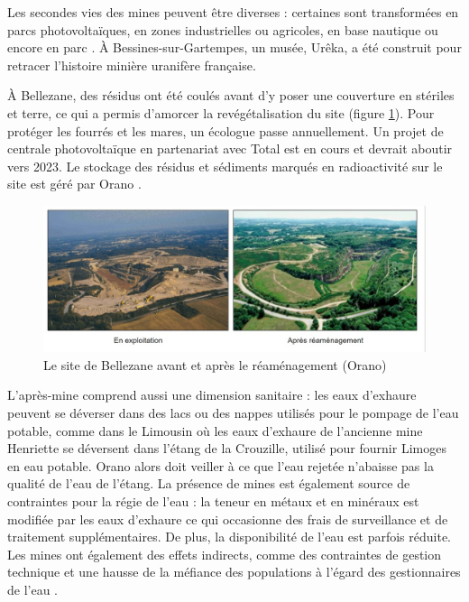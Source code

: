 \documentclass{article}
\begin{document}
Les secondes vies des mines peuvent être diverses : certaines sont transformées en parcs photovoltaïques, en zones industrielles ou agricoles, en base nautique ou encore en parc \cite{himeur_apres-mine_2020}. À Bessines-sur-Gartempes, un musée, Urêka, a été construit pour retracer l'histoire minière uranifère française.

À Bellezane, des résidus ont été coulés avant d’y poser une couverture en stériles et terre, ce qui a permis d'amorcer la revégétalisation du site (figure \ref{fig:bellezane_avant_apres}). Pour protéger les fourrés et les mares, un écologue passe annuellement. Un projet de centrale photovoltaïque en partenariat avec Total est en cours et devrait aboutir vers 2023. Le stockage des résidus et sédiments marqués en radioactivité sur le site est géré par Orano \cite{benesteau_site_2020}.

\begin{figure}[H]
    \centering
    \includegraphics[width=\textwidth]{I_B_2.jpg}
    \caption{Le site de Bellezane avant et après le réaménagement (Orano)}
    \label{fig:bellezane_avant_apres}
\end{figure}

L’après-mine comprend aussi une dimension sanitaire : les eaux d’exhaure peuvent se déverser dans des lacs ou des nappes utilisés pour le pompage de l’eau potable, comme dans le Limousin où les eaux d'exhaure de l'ancienne mine Henriette se déversent dans l'étang de la Crouzille, utilisé pour fournir Limoges en eau potable. Orano alors doit veiller à ce que l'eau rejetée n'abaisse pas la qualité de l'eau de l'étang. La présence de mines est également source de contraintes pour la régie de l’eau : la teneur en métaux et en minéraux est modifiée par les eaux d’exhaure ce qui occasionne des frais de surveillance et de traitement supplémentaires. De plus, la disponibilité de l’eau est parfois réduite. Les mines ont également des effets indirects, comme des contraintes de gestion technique et une hausse de la méfiance des populations à l’égard des gestionnaires de l’eau \cite{vialleseche_station_2020}.
\end{document}
